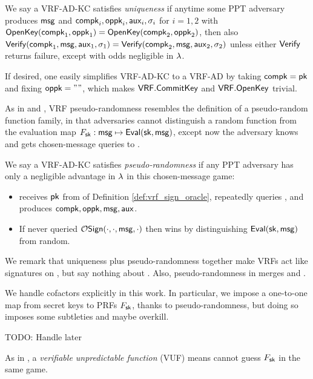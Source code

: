 \begin{definition}
We say a VRF-AD-KC satisfies {\em uniqueness} if anytime some PPT adversary \adv
produces $\mathsf{msg}$ and $\mathsf{compk}_i,\mathsf{oppk}_i,\mathsf{aux}_i,\sigma_i$ for $i=1,2$
 with ${\mathsf{OpenKey}}(\mathsf{compk}_1,\mathsf{oppk}_1) = {\mathsf{OpenKey}}(\mathsf{compk}_2,\mathsf{oppk}_2)$, then also
${\mathsf{Verify}}(\mathsf{compk}_1,\mathsf{msg},\mathsf{aux}_1,\sigma_1) = {\mathsf{Verify}}(\mathsf{compk}_2,\mathsf{msg},\mathsf{aux}_2,\sigma_2)$
unless either ${\mathsf{Verify}}$ returns failure,
except with odds negligible in $\lambda$.
\end{definition}

If desired, one easily simplifies VRF-AD-KC to a VRF-AD by
 taking $\mathsf{compk} = \mathsf{pk}$ and fixing $\mathsf{oppk} = \mathtt{""}$,
 which makes ${\mathsf{VRF}}.{\mathsf{CommitKey}}$ and ${\mathsf{VRF}}.{\mathsf{OpenKey}}$ trivial.

As in \cite{vrf_micali} and \cite{agg_dkg}, VRF pseudo-randomness
resembles the definition of a pseudo-random function family, in that
adversaries cannot distinguish a random function from the evaluation
map $F_\mathsf{sk} : \mathsf{msg} \mapsto {\ensuremath{\mathsf{Eval}}}(\mathsf{sk},\mathsf{msg})$,
except now the adversary knows \pk and gets chosen-message queries to \Sign.

\begin{definition}
We say a VRF-AD-KC satisfies {\em pseudo-randomness} if 
any PPT adversary \adv has only a negligible advantage in $\lambda$
in this chosen-message game:
\begin{itemize}
 \item \adv receives $\mathsf{pk}$ from  of Definition \ref{def:vrf_sign_oracle},
  repeatedly queries , and produces $\mathsf{compk},\mathsf{oppk},\mathsf{msg},\mathsf{aux}$. 
 \item If \adv never queried $\mathcal{O}\mathsf{Sign}(\cdot,\cdot,\mathsf{msg},\cdot)$ then
  \adv wins by distinguishing ${\mathsf{Eval}}(\mathsf{sk},\mathsf{msg})$ from random.
\end{itemize}
\end{definition}

We remark that uniqueness plus pseudo-randomness together make VRFs 
act like signatures on \msg, but say nothing about \aux.
Also, pseudo-randomness in \cite{vrf_micali} merges \Eval and \Sign.

We handle cofactors explicitly in this work.  In particular, we impose
a one-to-one map from secret keys \sk to PRFs $F_\mathsf{sk}$, thanks to
 pseudo-randomness, but doing so imposes some subtleties and maybe overkill.

TODO: Handle later


As in \cite{agg_dkg}, a {\em verifiable unpredictable function} (VUF)
means \adv cannot guess $F_\mathsf{sk}$ in the same game.

